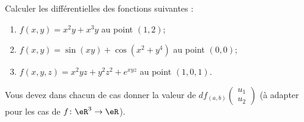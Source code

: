 
\begin{exercice}\label{exoOutilsMath-0030}

    Calculer les différentielles des fonctions suivantes :
    \begin{enumerate}
        \item
            $f(x,y)=x^2y+x^3y$ au point $(1,2)$;
        \item
            $f(x,y)=\sin(xy)+\cos(x^2+y^4)$ au point $(0,0)$;
        \item
            $f(x,y,z)=x^2yz+y^2z^2+ e^{xyz}$ au point $(1,0,1)$.
    \end{enumerate}
    Vous devez dans chacun de cas donner la valeur de $df_{(a,b)}\begin{pmatrix}
        u_1    \\ 
        u_2    
    \end{pmatrix}$ (à adapter pour les cas de $f\colon \eR^3\to \eR$).

\end{exercice}
